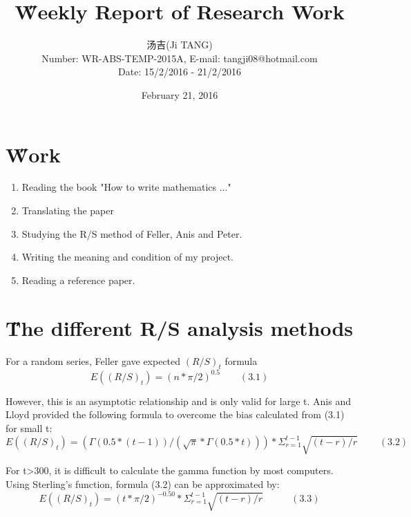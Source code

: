 \documentclass[12pt]{article}
\title{{\H Weekly Report of Research Work\\ }\quad {WR-ABS-TEMP-2015A-No.013}}
\author{汤吉(Ji TANG)\\
               Number: WR-ABS-TEMP-2015A,  E-mail: tangji08@hotmail.com \\
        Date: 15/2/2016 - 21/2/2016}
\date{February 21, 2016}
\begin{document}
  
\maketitle
\pagestyle{fancy}
\fancyhead[LO,RE]{\leftmark} %



\renewcommand{\headrulewidth}{0.4pt}
\renewcommand{\footrulewidth}{0.4pt}



\tableofcontents 
\newpage
\section{\H Work}
\begin{enumerate}
	\item Reading the book "How to write mathematics ..."
	\item Translating the paper
	\item Studying the R/S method of Feller, Anis and Peter.
	\item Writing the meaning and condition of my project.
	\item Reading a reference paper.
\end{enumerate}

\section{\H The different R/S analysis methods}
For a random series, Feller gave expected $(R/S)_t$ formula
$$E((R/S)_t)=(n*\pi/2)^{0.5}   ~~~~~~~~~(3.1)$$

However, this is an asymptotic relationship and is only valid for large t. Anis and Lloyd provided the following formula to overcome the bias calculated from
(3.1) for small t:
$$E((R/S)_t)=(\Gamma(0.5*(t-1))/(\sqrt{\pi}*\Gamma(0.5*t)))*\Sigma_{r=1}^{t-1}\sqrt{(t-r)/r} ~~~~~~~~~~(3.2)$$

For t>300, it is difficult to calculate the gamma function
by most computers. Using Sterling’s function, formula
(3.2) can be approximated by:
$$E((R/S)_t)=(t*\pi/2)^{-0.50}*\Sigma_{r=1}^{t-1}\sqrt{(t-r)/r}    ~~~~~~~~~~~~~(3.3)$$
\end{document}
